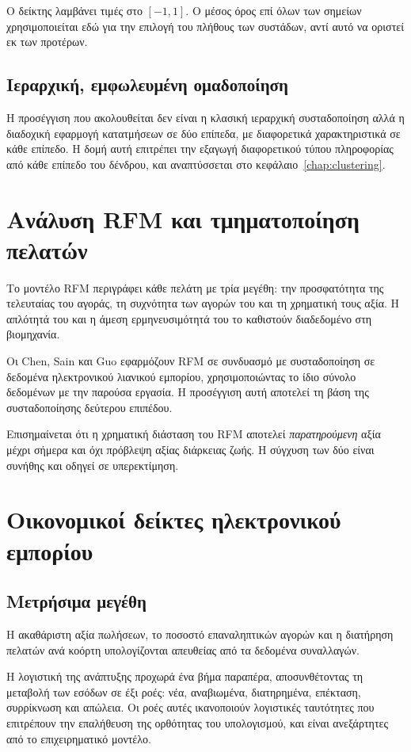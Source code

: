 Ο δείκτης λαμβάνει τιμές στο $[-1, 1]$. Ο μέσος όρος επί όλων των σημείων
χρησιμοποιείται εδώ για την επιλογή του πλήθους των συστάδων, αντί αυτό να
οριστεί εκ των προτέρων.

\subsection{Ιεραρχική, εμφωλευμένη ομαδοποίηση}

Η προσέγγιση που ακολουθείται δεν είναι η κλασική ιεραρχική συσταδοποίηση αλλά
η διαδοχική εφαρμογή κατατμήσεων σε δύο επίπεδα, με διαφορετικά χαρακτηριστικά
σε κάθε επίπεδο. Η δομή αυτή επιτρέπει την εξαγωγή διαφορετικού τύπου
πληροφορίας από κάθε επίπεδο του δένδρου, και αναπτύσσεται στο
κεφάλαιο~\ref{chap:clustering}.

\section{Ανάλυση RFM και τμηματοποίηση πελατών}

Το μοντέλο RFM περιγράφει κάθε πελάτη με τρία μεγέθη: την προσφατότητα της
τελευταίας του αγοράς, τη συχνότητα των αγορών του και τη χρηματική τους αξία.
Η απλότητά του και η άμεση ερμηνευσιμότητά του το καθιστούν διαδεδομένο στη
βιομηχανία.

Οι Chen, Sain και Guo \cite{chen2012data} εφαρμόζουν RFM σε συνδυασμό με
συσταδοποίηση σε δεδομένα ηλεκτρονικού λιανικού εμπορίου, χρησιμοποιώντας το ίδιο σύνολο
δεδομένων με την παρούσα εργασία. Η προσέγγιση αυτή αποτελεί τη βάση της
συσταδοποίησης δεύτερου επιπέδου.

Επισημαίνεται ότι η χρηματική διάσταση του RFM αποτελεί \emph{παρατηρούμενη}
αξία μέχρι σήμερα και όχι πρόβλεψη αξίας διάρκειας ζωής. Η σύγχυση των δύο
είναι συνήθης και οδηγεί σε υπερεκτίμηση.

\section{Οικονομικοί δείκτες ηλεκτρονικού εμπορίου}

\subsection{Μετρήσιμα μεγέθη}

Η ακαθάριστη αξία πωλήσεων, το ποσοστό επαναληπτικών αγορών και η διατήρηση
πελατών ανά κοόρτη υπολογίζονται απευθείας από τα δεδομένα συναλλαγών.

Η λογιστική της ανάπτυξης προχωρά ένα βήμα παραπέρα, αποσυνθέτοντας τη μεταβολή
των εσόδων σε έξι ροές: νέα, αναβιωμένα, διατηρημένα, επέκταση, συρρίκνωση και
απώλεια. Οι ροές αυτές ικανοποιούν λογιστικές ταυτότητες που επιτρέπουν την
επαλήθευση της ορθότητας του υπολογισμού, και είναι ανεξάρτητες από το
επιχειρηματικό μοντέλο.

